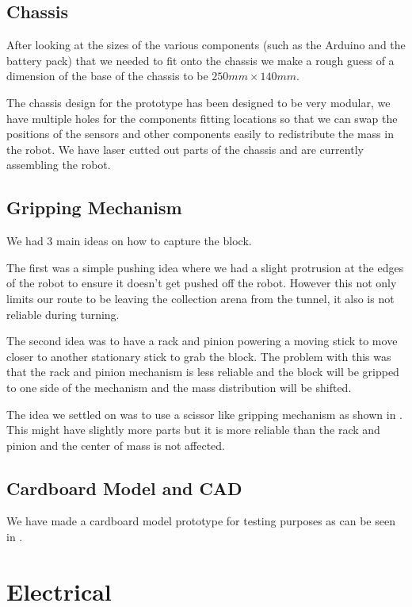 \documentclass{article}
\begin{document}
\subsection{Chassis}
\quad After looking at the sizes of the various components (such as the Arduino and the battery pack) that we needed to fit onto the chassis we make a rough guess of a dimension of the base of the chassis to be $250mm \times 140mm$.

The chassis design for the prototype has been designed to be very modular, we have multiple holes for the components fitting locations so that we can swap the positions of the sensors and other components easily to redistribute the mass in the robot. We have laser cutted out parts of the chassis and are currently assembling the robot.

\subsection{Gripping Mechanism}
\quad We had 3 main ideas on how to capture the block. 

\quad The first was a simple pushing idea where we had a slight protrusion at the edges of the robot to ensure it doesn't get pushed off the robot. However this not only limits our route to be leaving the collection arena from the tunnel, it also is not reliable during turning.

\quad The second idea was to have a rack and pinion powering a moving stick to move closer to another stationary stick to grab the block. The problem with this was that the rack and pinion mechanism is less reliable and the block will be gripped to one side of the mechanism and the mass distribution will be shifted.

\quad The idea we settled on was to use a scissor like gripping mechanism as shown in . This might have slightly more parts but it is more reliable than the rack and pinion and the center of mass is not affected.

\subsection{Cardboard Model and CAD}
\quad We have made a cardboard model prototype for testing purposes as can be seen in .

\section{Electrical}
\end{document}
